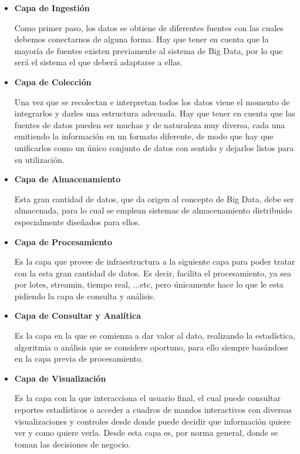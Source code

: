 \begin{itemize}
	\item \textbf{Capa de Ingestión}
	
	Como primer paso, los datos se obtiene de diferentes fuentes con las cuales debemos conectarnos de alguna forma. Hay que tener en cuenta que la mayoría de fuentes existen previamente al sistema de Big Data, por lo que será el sistema el que deberá adaptarse a ellas. 
	
	\item \textbf{Capa de Colección}
	
	Una vez que se recolectan e interpretan todos los datos viene el momento de integrarlos y darles una estructura adecuada. Hay que tener en cuenta que las fuentes de datos pueden ser muchas y de naturaleza muy diversa, cada una emitiendo la información en un formato diferente, de modo que hay que unificarlos como un único conjunto de datos con sentido y dejarlos listos para su utilización.
	
	\item \textbf{Capa de Almacenamiento}
	
	Esta gran cantidad de datos, que da origen al concepto de Big Data, debe ser almacenada, para lo cual se emplean sistemas de almacenamiento distribuido especialmente diseñados para ellos.
	
	\item \textbf{Capa de Procesamiento}
	
	Es la capa que provee de infraestructura a la siguiente capa para poder tratar con la esta gran cantidad de datos. Es decir, facilita el procesamiento, ya sea por lotes, streamin, tiempo real, ...etc, pero únicamente hace lo que le esta pidiendo la capa de consulta y análisis.
	
	\item \textbf{Capa de Consultar y Analítica}
	
	Es la capa en la que se comienza a dar valor al dato, realizando la estadística, algoritmia o análisis que se considere oportuno, para ello siempre basándose en la capa previa de procesamiento.
	
	\item \textbf{Capa de Visualización}
	
	Es la capa con la que interacciona el usuario final, el cual puede consultar reportes estadísticos o acceder a cuadros de mandos interactivos con diversas visualizaciones y controles desde donde puede decidir que información quiere ver y como quiere verla. Desde esta capa es, por norma general, donde se toman las decisiones de negocio.
	

\end{itemize}
